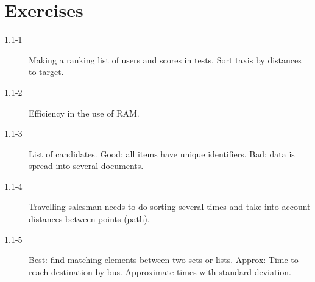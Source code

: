 \section*{Exercises}


\begin{description}
 \item[1.1-1] Making a ranking list of users and scores in tests. Sort taxis by distances to target.
 \item[1.1-2] Efficiency in the use of RAM.
 \item[1.1-3] List of candidates. Good: all items have unique identifiers. Bad: data is spread into several documents.
 \item[1.1-4] Travelling salesman needs to do sorting several times and take into account distances between points (path).
 \item[1.1-5] Best: find matching elements between two sets or lists. Approx: Time to reach destination by bus. Approximate times with standard deviation.
\end{description}
